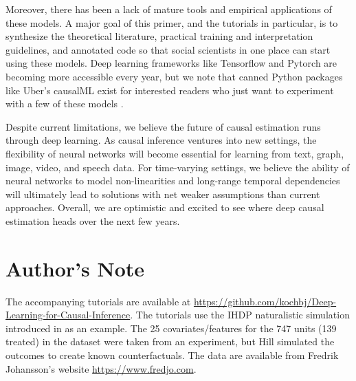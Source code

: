 Moreover, there has been a lack of mature tools and empirical applications of these models. A major goal of this primer, and the tutorials in particular, is to synthesize the theoretical literature, practical training and interpretation guidelines,  and annotated code so that social scientists in one place can start using these models. Deep learning frameworks like Tensorflow and Pytorch are becoming more accessible every year, but we note that canned Python packages like Uber's causalML exist for interested readers who just want to experiment with a few of these models \citep{chen2020causalml}.
 
Despite current limitations, we believe the future of causal estimation runs through deep learning. As causal inference ventures into new settings, the flexibility of neural networks will become essential for learning from text, graph, image, video, and speech data. For time-varying settings, we believe the ability of neural networks to model non-linearities and long-range temporal dependencies will ultimately lead to solutions with net weaker assumptions than current approaches. Overall, we are optimistic and excited to see where deep causal estimation heads over the next few years.

\section{Author's Note}
The accompanying tutorials are available at \href{https://github.com/kochbj/Deep-Learning-for-Causal-Inference}{https://github.com/kochbj/Deep-Learning-for-Causal-Inference}. The tutorials use the IHDP naturalistic simulation introduced in \citet{Hill2011} as an example. The  25 covariates/features for the 747 units (139 treated) in the dataset were taken from an experiment, but Hill simulated the outcomes to create known counterfactuals. The data are available from Fredrik Johansson's website \href{https://www.fredjo.com}{https://www.fredjo.com}.